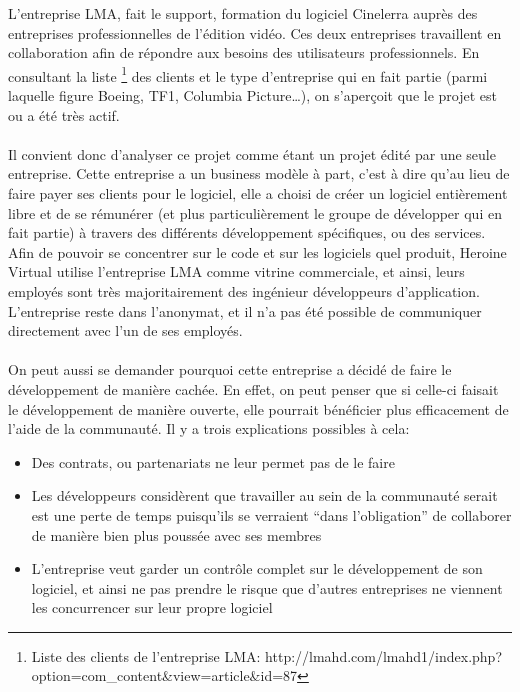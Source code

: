 L'entreprise LMA, fait le support, formation du logiciel Cinelerra
auprès des entreprises professionnelles de l'édition vidéo. Ces deux
entreprises travaillent en collaboration afin de répondre aux besoins
des utilisateurs professionnels. En consultant la liste \footnote{Liste
des clients de l'entreprise LMA:
  http://lmahd.com/lmahd1/index.php?option=com\_content\&view=article\&id=87}
des clients et le type d'entreprise qui en fait partie (parmi laquelle
figure Boeing, TF1, Columbia Picture\ldots), on s'aperçoit que le projet
est ou a été très actif.

\paragraph{}

Il convient donc d'analyser ce projet comme étant un projet édité par
une seule entreprise. Cette entreprise a un business modèle à part,
c'est à dire qu'au lieu de faire payer ses clients pour le logiciel, elle
a choisi de créer un logiciel entièrement libre et de se rémunérer
(et plus particulièrement le groupe de développer qui en fait partie) à
travers des différents développement spécifiques, ou des services. Afin
de pouvoir se concentrer sur le code et sur les logiciels quel produit,
Heroine Virtual utilise l'entreprise LMA comme vitrine commerciale,
et ainsi, leurs employés sont très majoritairement des ingénieur
développeurs d'application.  L'entreprise reste dans l'anonymat,
et il n'a pas été possible de communiquer directement avec l'un de
ses employés.

\paragraph{}

On peut aussi se demander pourquoi cette entreprise a décidé de faire
le développement de manière cachée. En effet, on peut penser que si
celle-ci faisait le développement de manière ouverte, elle pourrait
bénéficier plus efficacement de l'aide de la communauté. Il y a trois
explications possibles à cela:

\begin{itemize}

  \item {Des contrats, ou partenariats ne leur permet pas de le faire}

  \item {Les développeurs considèrent que travailler au sein de la
  communauté serait est une perte de temps puisqu'ils se verraient
  ``dans l'obligation'' de collaborer de manière bien plus poussée
  avec ses membres}

  \item {L'entreprise veut garder un contrôle complet sur le
    développement de son logiciel, et ainsi ne pas prendre le risque
    que d'autres entreprises ne viennent les concurrencer sur leur
    propre logiciel}

\end{itemize}

